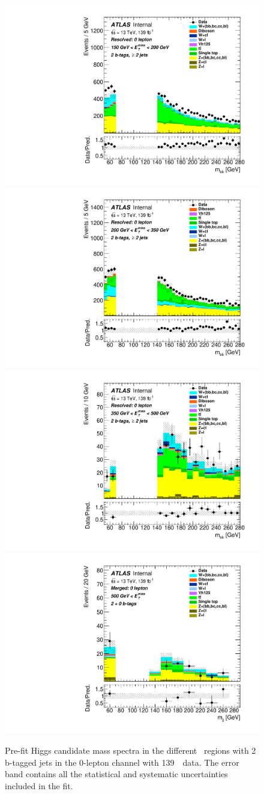 \begin{figure}[H]
  \includegraphics[width=0.46\linewidth]{chapters/c9/figures/Region_distmBB_J2_L0_T2_DSR_Y2015_incJet1_Fat0_incFat1_BMin150_BMax200_Prefit.pdf}
  \includegraphics[width=0.46\linewidth]{chapters/c9/figures/Region_distmBB_J2_L0_T2_DSR_Y2015_incJet1_Fat0_incFat1_BMin200_BMax350_Prefit.pdf}\\
  \includegraphics[width=0.46\linewidth]{chapters/c9/figures/Region_distmBB_J2_L0_T2_DSR_Y2015_incJet1_Fat0_incFat1_BMin350_BMax500_Prefit.pdf}
  \includegraphics[width=0.46\linewidth]{chapters/c9/figures/Region_BMin500_incFat1_Fat1_incJet1_Y2015_DSR_T20_L0_distmBB_J0_Prefit.pdf}
\caption{Pre-fit Higgs candidate mass spectra in the different \met~regions with 2 b-tagged jets in the 0-lepton channel with 139~\ifb~data. The error band contains all the statistical and systematic uncertainties included in the fit.}
\label{fig:Data_MC_SR_m_jj_2b}
\end{figure}



